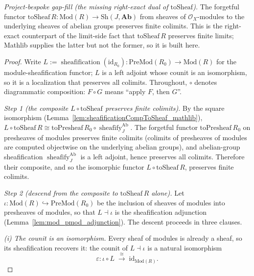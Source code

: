 \begin{lemma}
  \label{lem:toSheaf_preservesFiniteColimits}
  \leanok
  \textit{Project-bespoke gap-fill (the missing right-exact dual of \(\mathrm{toSheaf}\)).}
  The forgetful functor \(\mathrm{toSheaf}\,R : \mathrm{Mod}(R) \to \mathrm{Sh}(J, \mathbf{Ab})\)
  from sheaves of \(\mathcal{O}_X\)-modules to the underlying sheaves of abelian groups preserves
  finite colimits. This is the right-exact counterpart of the limit-side fact that
  \(\mathrm{toSheaf}\,R\) preserves finite limits; Mathlib supplies the latter but not the former, so
  it is built here.
\end{lemma}
\begin{proof}
  \leanok
  Write \(L := \operatorname{sheafification}(\mathrm{id}_{R_0}) : \mathrm{PreMod}(R_0) \to
  \mathrm{Mod}(R)\) for the module-sheafification functor; \(L\) is a left adjoint whose counit is an
  isomorphism, so it is a localization that preserves all colimits. Throughout, \(\circ\) denotes
  diagrammatic composition: \(F \circ G\) means ``apply \(F\), then \(G\)''.

  \emph{Step 1 (the composite \(L \circ \mathrm{toSheaf}\) preserves finite colimits).} By the
  square isomorphism (Lemma~\ref{lem:sheafificationCompToSheaf_mathlib}),
  \(L \circ \mathrm{toSheaf}\,R \cong \mathrm{toPresheaf}\,R_0 \circ
  \operatorname{sheafify}_J^{\mathrm{Ab}}\). The forgetful functor \(\mathrm{toPresheaf}\,R_0\) on
  presheaves of modules preserves finite colimits (colimits of presheaves of modules are computed
  objectwise on the underlying abelian groups), and abelian-group sheafification
  \(\operatorname{sheafify}_J^{\mathrm{Ab}}\) is a left adjoint, hence preserves all colimits.
  Therefore their composite, and so the isomorphic functor \(L \circ \mathrm{toSheaf}\,R\), preserves
  finite colimits.

  \emph{Step 2 (descend from the composite to \(\mathrm{toSheaf}\,R\) alone).} Let
  \(\iota : \mathrm{Mod}(R) \hookrightarrow \mathrm{PreMod}(R_0)\) be the inclusion of sheaves of
  modules into presheaves of modules, so that \(L \dashv \iota\) is the sheafification adjunction
  (Lemma~\ref{lem:mod_pmod_adjunction}). The descent proceeds in three clauses.

  \emph{(i) The counit is an isomorphism.} Every sheaf of modules is already a sheaf, so its
  sheafification recovers it: the counit of \(L \dashv \iota\) is a natural isomorphism
  \[
    \varepsilon : \iota \circ L \;\xrightarrow{\;\cong\;}\; \mathrm{id}_{\mathrm{Mod}(R)} .
  \]


\end{proof}
